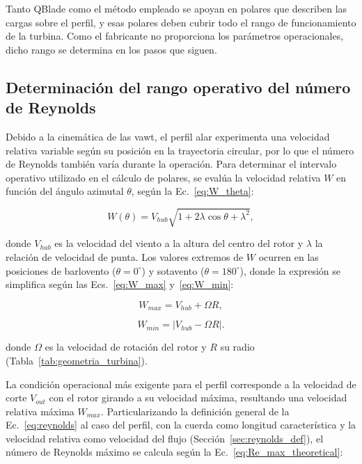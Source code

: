 Tanto QBlade como el método empleado se apoyan en polares que describen las cargas sobre el perfil, y esas polares deben cubrir todo el rango de funcionamiento de la turbina. Como el fabricante no proporciona los parámetros operacionales, dicho rango se determina en los pasos que siguen.

\subsection{Determinación del rango operativo del número de Reynolds}
\label{sec:reynolds}

Debido a la cinemática de las \gls{vawt}, el perfil alar experimenta una velocidad relativa variable según su posición en la trayectoria circular, por lo que el número de Reynolds también varía durante la operación. Para determinar el intervalo operativo utilizado en el cálculo de polares, se evalúa la velocidad relativa $W$ en función del ángulo azimutal $\theta$, según la Ec.~\ref{eq:W_theta}:

\begin{equation}
    W(\theta) = V_{hub} \sqrt{1 + 2\lambda \cos\theta + \lambda^2},
    \label{eq:W_theta}
\end{equation}

donde $V_{hub}$ es la velocidad del viento a la altura del centro del rotor y $\lambda$ la relación de velocidad de punta. Los valores extremos de $W$ ocurren en las posiciones de barlovento ($\theta = 0^\circ$) y sotavento ($\theta = 180^\circ$), donde la expresión se simplifica según las Ecs.~\ref{eq:W_max} y~\ref{eq:W_min}:

\begin{equation}
    W_{max} = V_{hub} + \Omega R,
    \label{eq:W_max}
\end{equation}

\begin{equation}
    W_{min} = |V_{hub} - \Omega R|.
    \label{eq:W_min}
\end{equation}

donde $\Omega$ es la velocidad de rotación del rotor y $R$ su radio (Tabla~\ref{tab:geometria_turbina}).

La condición operacional más exigente para el perfil corresponde a la velocidad de corte $V_{out}$ con el rotor girando a su velocidad máxima, resultando una velocidad relativa máxima $W_{max}$. Particularizando la definición general de la Ec.~\ref{eq:reynolds} al caso del perfil, con la cuerda como longitud característica y la velocidad relativa como velocidad del flujo (Sección~\ref{sec:reynolds_def}), el número de Reynolds máximo se calcula según la Ec.~\ref{eq:Re_max_theoretical}:

